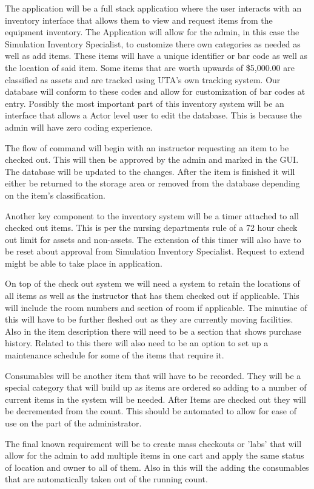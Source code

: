 
The application will be a full stack application where the user interacts with an inventory interface that allows them to view and request items from the equipment inventory. The Application will allow for the admin, in this case the Simulation Inventory Specialist, to customize there own categories as needed as well as add items. These items will have a unique identifier or bar code as well as the location of said item. Some items that are worth upwards of \$5,000.00 are classified as assets and are tracked using UTA's own tracking system. Our database will conform to these codes and allow for customization of bar codes at entry. Possibly the most important part of this inventory system will be an interface that allows a Actor level user to edit the database. This is because the admin will have zero coding experience.

The flow of command will begin with an instructor requesting an item to be checked out. This will then be approved by the admin and marked in the GUI. The database will be updated to the changes. After the item is finished it will either be returned to the storage area or removed from the database depending on the item's classification.

Another key component to the inventory system will be a timer attached to all checked out items.  This is per the nursing departments rule of a 72 hour check out limit for assets and non-assets. The extension of this timer will also have to be reset about approval from Simulation Inventory Specialist. Request to extend might be able to take place in application. 

On top of the check out system we will need a system to retain the locations of all items as well as the instructor that has them checked out if applicable. This will include the room numbers and section of room if applicable. The minutiae of this will have to be further fleshed out as they are currently moving facilities. Also in the item description there will  need to be a section that shows purchase history. Related to this there will also need to be an option to set up a maintenance schedule for some of the items that require it.

Consumables will be another item that will have to be recorded. They will be a special category that will build up as items are ordered so adding to a number of current items in the system will be needed. After Items are checked out they will be decremented from the count. This should be automated to allow for ease of use on the part of the administrator.

The final known requirement will be to create mass checkouts or 'labs' that will allow for the admin to add multiple items in one cart and apply the same status of location and owner to all of them. Also in this will the adding the consumables that are automatically taken out of the running count.
